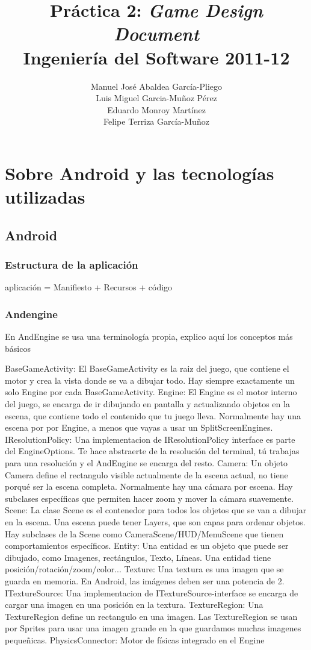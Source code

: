 \documentclass[12 pt, a4paper, twoside]{article}
\title{Práctica 2: {\em Game Design Document}\\Ingeniería del Software 2011-12}
\author{Manuel José Abaldea García-Pliego\\
Luis Miguel Garcia-Muñoz Pérez\\
Eduardo Monroy Martínez\\
Felipe Terriza García-Muñoz}
\date{}
\begin{document}
\maketitle


\newpage

\tableofcontents

\section{Sobre Android y las tecnologías utilizadas}
\subsection{Android}
\subsubsection{Estructura de la aplicación}
aplicación = Manifiesto + Recursos + código

\subsubsection{Andengine}
En AndEngine se usa una terminología propia, explico aquí los conceptos más básicos

    BaseGameActivity: El BaseGameActivity es la raiz del juego, que contiene el motor y crea la vista donde se va a dibujar todo. Hay siempre exactamente un solo Engine por cada BaseGameActivity.
    Engine: El Engine es el motor interno del juego, se encarga de ir dibujando en pantalla y actualizando objetos en la escena, que contiene todo el contenido que tu juego lleva. Normalmente hay una escena por por Engine, a menos que vayas a usar un SplitScreenEngines.
    IResolutionPolicy: Una implementacion de IResolutionPolicy interface es parte del EngineOptions. Te hace abstraerte de la resolución del terminal, tú trabajas para una resolución y el AndEngine se encarga del resto.
    Camera: Un objeto Camera define el rectangulo visible actualmente de la escena actual, no tiene porqué ser la escena completa. Normalmente hay una cámara por escena. Hay subclases específicas que permiten hacer zoom y mover la cámara suavemente.
    Scene: La clase Scene es el contenedor para todos los objetos que se van a dibujar en la escena. Una escena puede tener Layers, que son capas para ordenar objetos. Hay subclases de la Scene como CameraScene/HUD/MenuScene que tienen comportamientos específicos.
    Entity: Una entidad es un objeto que puede ser dibujado, como Imagenes, rectángulos, Texto, Líneas. Una entidad tiene posición/rotación/zoom/color...
    Texture: Una textura es una imagen que se guarda en memoria. En Android, las imágenes deben ser una potencia de 2.
    ITextureSource: Una implementacion de ITextureSource-interface se encarga de cargar una imagen en una posición en la textura.
    TextureRegion: Una TextureRegion define un rectangulo en una imagen. Las TextureRegion se usan por Sprites para usar una imagen grande en la que guardamos muchas imagenes pequeñicas.
    PhysicsConnector: Motor de físicas integrado en el Engine
\end{document}

